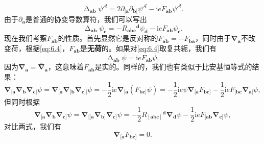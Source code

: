 \begin{equation}
	\upDelta _{\boldsymbol{ab}} \psi ^{\mathcal{A}} =2\partial _{[\boldsymbol{a}} \partial _{\boldsymbol{b}]} \psi ^{\mathcal{A}} -\mathrm{i} eF_{\boldsymbol{ab}} \psi ^{\mathcal{A}} .
	\label{eq:6.6}
\end{equation}
由于$\partial _{\boldsymbol{a}}$是普通的协变导数算符，我们可以写出
\begin{equation*}
	\upDelta _{\boldsymbol{ab}} \psi _{\boldsymbol{c}} =-R{_{\boldsymbol{abc}}}^{\boldsymbol{d}} \psi _{\boldsymbol{d}} -\mathrm{i} eF_{\boldsymbol{ab}} \psi _{\boldsymbol{c}} .
\end{equation*}
现在我们考察$F_{\boldsymbol{ab}}$的性质。首先显然它是反对称的$F_{\boldsymbol{ab}} =-F_{\boldsymbol{ba}}$，同时由于$\boldsymbol{\nabla }_{\boldsymbol{a}}$不改变荷，根据\ref{eq:6.4}，$F_{\boldsymbol{ab}}$是\textbf{无荷}的。如果对\ref{eq:6.4}取复共轭，我们有
\begin{equation*}
	\upDelta _{\boldsymbol{ab}}\overline{\psi } =\mathrm{i} eF_{\boldsymbol{ab}}\overline{\psi } ,
\end{equation*}
因为$\boldsymbol{\nabla }_{\boldsymbol{a}} =\overline{\boldsymbol{\nabla }}_{\boldsymbol{a}}$，这意味着$F_{\boldsymbol{ab}}$是实的。同样的，我们也有类似于比安基恒等式的结果：
\begin{equation*}
	\boldsymbol{\nabla }_{[\boldsymbol{a}}\boldsymbol{\nabla }_{\boldsymbol{b}}\boldsymbol{\nabla }_{\boldsymbol{c}]} \psi =\boldsymbol{\nabla }_{[\boldsymbol{a}}\boldsymbol{\nabla }_{[\boldsymbol{b}}\boldsymbol{\nabla }_{\boldsymbol{c}]]} \psi =-\frac{1}{2}\mathrm{i} e\boldsymbol{\nabla }_{[\boldsymbol{a}} (F_{\boldsymbol{bc}]} \psi )=-\frac{1}{2}\mathrm{i} e\psi \boldsymbol{\nabla }_{[\boldsymbol{a}} F_{\boldsymbol{bc}]} -\frac{1}{2}\mathrm{i} eF_{[\boldsymbol{bc}}\boldsymbol{\nabla }_{\boldsymbol{a}]} \psi ,
\end{equation*}
但同时根据
\begin{equation*}
	\boldsymbol{\nabla }_{[\boldsymbol{a}}\boldsymbol{\nabla }_{\boldsymbol{b}}\boldsymbol{\nabla }_{\boldsymbol{c}]} \psi =\boldsymbol{\nabla }_{[[\boldsymbol{a}}\boldsymbol{\nabla }_{\boldsymbol{b}]}\boldsymbol{\nabla }_{\boldsymbol{c}]} \psi =-\frac{1}{2} R{_{[\boldsymbol{abc}]}}^{\boldsymbol{d}}\boldsymbol{\nabla }_{\boldsymbol{d}} \psi -\frac{1}{2}\mathrm{i} eF_{[\boldsymbol{ab}}\boldsymbol{\nabla }_{\boldsymbol{c}]} \psi ,
\end{equation*}
对比两式，我们有
\begin{equation}
	\boldsymbol{\nabla }_{[\boldsymbol{a}} F_{\boldsymbol{bc}]} =0.
	\label{eq:6.7}
\end{equation}
